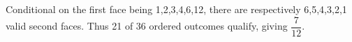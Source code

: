 Conditional on the first face being 1,2,3,4,6,12, there are respectively 6,5,4,3,2,1 valid second faces. Thus 21 of 36 ordered outcomes qualify, giving $\boxed{\dfrac{7}{12}}$.
